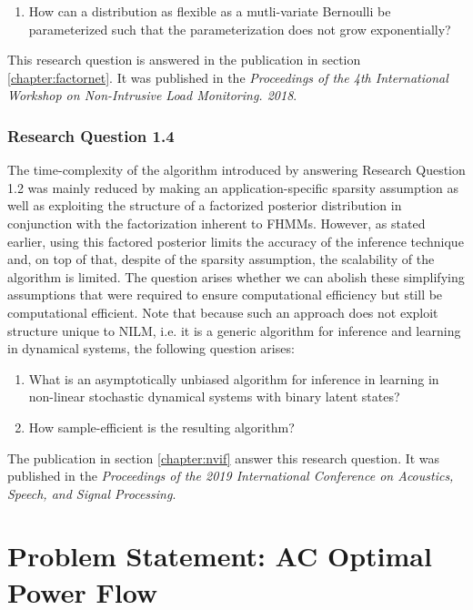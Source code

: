 \documentclass[11pt]{cmuthesis} %
\begin{document}
\begin{enumerate}
\item How can a distribution as flexible as a mutli-variate Bernoulli be parameterized such that the parameterization does not grow exponentially?
\end{enumerate}

This research question is answered in the publication in section \ref{chapter:factornet}. It was published in the \emph{Proceedings of the 4th International Workshop on Non-Intrusive Load Monitoring. 2018}.

\newpage
\subsubsection{Research Question 1.4}

The time-complexity of the algorithm introduced by answering Research Question 1.2 was mainly reduced by making an application-specific sparsity assumption as well as exploiting the structure of a factorized posterior distribution in conjunction with the factorization inherent to FHMMs. However, as stated earlier, using this factored posterior limits the accuracy of the inference technique and, on top of that, despite of the sparsity assumption, the scalability of the algorithm is limited. The question arises whether we can abolish these simplifying assumptions that were required to ensure computational efficiency but still be computational efficient. Note that because such an approach does not exploit structure unique to NILM, i.e. it is a generic algorithm for inference and learning in dynamical systems, the following question arises:

\begin{enumerate}
\item What is an asymptotically unbiased algorithm for inference in learning in non-linear stochastic dynamical systems with binary latent states?
\item How sample-efficient is the resulting algorithm?
\end{enumerate}

The publication in section \ref{chapter:nvif} answer this research question. It was published in the \emph{Proceedings of the 2019 International Conference on Acoustics, Speech, and Signal Processing}.

\newpage
\section{Problem Statement: AC Optimal Power Flow}
\end{document}
